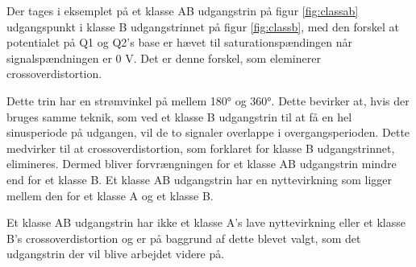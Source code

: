 Der tages i eksemplet på et klasse AB udgangstrin på figur \ref{fig:classab} udgangspunkt i klasse B udgangstrinnet på figur \ref{fig:classb}, med den forskel at potentialet på Q1 og Q2's base er hævet til saturationspændingen når signalspændningen er 0 V. Det er denne forskel, som eleminerer crossoverdistortion.

Dette trin har en strømvinkel på mellem 180° og 360°. Dette bevirker at, hvis der bruges samme teknik, som ved et klasse B udgangstrin til at få en hel sinusperiode på udgangen, vil de to signaler overlappe i overgangsperioden. Dette medvirker til at crossoverdistortion, som forklaret for klasse B udgangstrinnet, elimineres. Dermed bliver forvrængningen for et klasse AB udgangstrin mindre end for et klasse B.
Et klasse AB udgangstrin har en nyttevirkning som ligger mellem den for et klasse A og et klasse B.

Et klasse AB udgangstrin har ikke et klasse A's lave nyttevirkning eller et klasse B's crossoverdistortion og er på baggrund af dette blevet valgt, som det udgangstrin der vil blive arbejdet videre på.